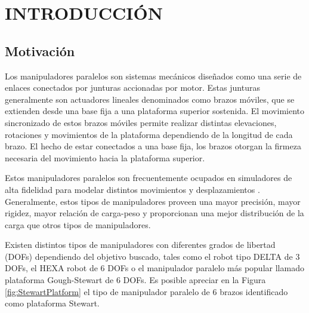 \chapter{INTRODUCCIÓN}\label{cap:Introduccción}

\section{Motivación}

Los manipuladores paralelos son sistemas mecánicos diseñados como una serie de enlaces conectados por junturas accionadas por motor. Estas junturas generalmente son actuadores lineales denominados como brazos móviles, que se extienden desde una base fija a una plataforma superior sostenida. El movimiento sincronizado de estos brazos móviles permite realizar distintas elevaciones, rotaciones y movimientos de la plataforma dependiendo de la longitud de cada brazo. El hecho de estar conectados a una base fija, los brazos otorgan la firmeza necesaria del movimiento hacia la plataforma superior.

Estos manipuladores paralelos son frecuentemente ocupados en simuladores de alta fidelidad para modelar distintos movimientos y desplazamientos \cite{anderson2004hexapods,wang2010perfomancemanipulators,merlet1992ParallelMS}.  Generalmente, estos tipos de manipuladores proveen una mayor precisión, mayor rigidez, mayor relación de carga-peso y proporcionan una mejor distribución de la carga que otros tipos de manipuladores. 

Existen distintos tipos de manipuladores con diferentes grados de libertad (DOFs) dependiendo del objetivo buscado, tales como el robot tipo DELTA \cite{pierrot1990deltarobot} de $3$ DOFs, el HEXA robot \cite{pierrot1991hexarobot} de $6$ DOFs o el manipulador paralelo más popular llamado plataforma Gough-Stewart \cite{stewart1965} de $6$ DOFs. Es posible apreciar en la Figura \ref{fig:StewartPlatform} el tipo de manipulador paralelo de $6$ brazos identificado como plataforma Stewart.

